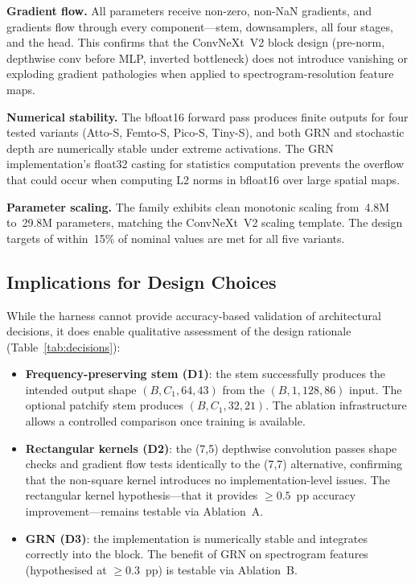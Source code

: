 \documentclass{article}
\begin{document}
\textbf{Gradient flow.} All parameters receive non-zero, non-NaN gradients, and
gradients flow through every component---stem, downsamplers, all four stages, and
the head. This confirms that the ConvNeXt~V2 block design (pre-norm, depthwise
conv before MLP, inverted bottleneck) does not introduce vanishing or exploding
gradient pathologies when applied to spectrogram-resolution feature maps.

\textbf{Numerical stability.} The bfloat16 forward pass produces finite outputs
for four tested variants (Atto-S, Femto-S, Pico-S, Tiny-S), and both GRN and
stochastic depth are numerically stable under extreme activations. The GRN
implementation's float32 casting for statistics computation prevents the
overflow that could occur when computing L2 norms in bfloat16 over large
spatial maps.

\textbf{Parameter scaling.} The family exhibits clean monotonic scaling from~4.8M
to~29.8M parameters, matching the ConvNeXt~V2 scaling template. The design
targets of within~15\% of nominal values are met for all five variants.

\subsection{Implications for Design Choices}

While the harness cannot provide accuracy-based validation of architectural
decisions, it does enable qualitative assessment of the design rationale
(Table~\ref{tab:decisions}):

\begin{itemize}
  \item \textbf{Frequency-preserving stem (D1)}: the stem successfully produces
  the intended output shape $(B, C_1, 64, 43)$ from the $(B, 1, 128, 86)$ input.
  The optional patchify stem produces $(B, C_1, 32, 21)$. The ablation
  infrastructure allows a controlled comparison once training is available.
  \item \textbf{Rectangular kernels (D2)}: the (7,5) depthwise convolution
  passes shape checks and gradient flow tests identically to the (7,7)
  alternative, confirming that the non-square kernel introduces no
  implementation-level issues. The rectangular kernel hypothesis---that it
  provides $\geq 0.5$~pp accuracy improvement---remains testable via Ablation~A.
  \item \textbf{GRN (D3)}: the implementation is numerically stable and
  integrates correctly into the block. The benefit of GRN on spectrogram
  features (hypothesised at $\geq 0.3$~pp) is testable via Ablation~B.
\end{itemize}
\end{document}
